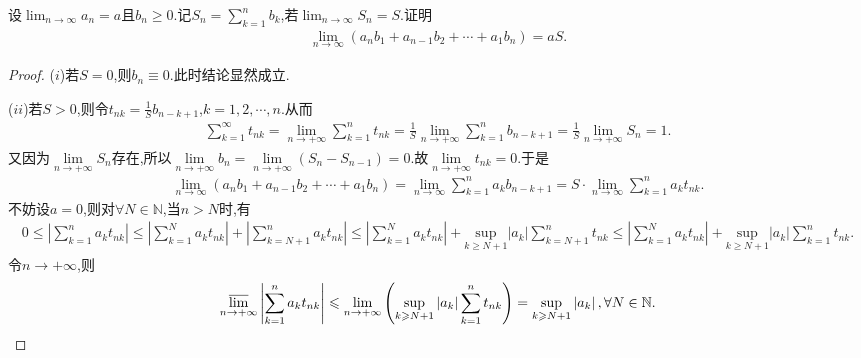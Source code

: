 \documentclass[../../main.tex]{subfiles}%
\begin{document}
\begin{proposition}\label{proposition:命题:3.422164}
设\(\lim_{n \to \infty} a_n = a\)且\(b_n \geqslant 0\).记\(S_n = \sum\limits_{k = 1}^{n} b_k\),若\(\lim_{n \to \infty} S_n = S\).证明
\begin{align*}
\lim_{n \to \infty} (a_n b_1 + a_{n - 1} b_2 + \cdots + a_1 b_n) = aS.
\end{align*}
\end{proposition}
\begin{proof}
($i$)若$S=0$,则$b_n\equiv0$.此时结论显然成立.

($ii$)若$S>0$,则令\(t_{nk} = \frac{1}{S} b_{n - k + 1}\),\(k = 1,2,\cdots,n\).从而
\begin{align*}
\sum\limits_{k=1}^{\infty}{t_{nk}}=\underset{n\rightarrow +\infty}{\lim}\sum\limits_{k=1}^n{t_{nk}}=\frac{1}{S}\underset{n\rightarrow +\infty}{\lim}\sum\limits_{k=1}^n{b_{n-k+1}}=\frac{1}{S}\underset{n\rightarrow +\infty}{\lim}S_n=1.
\end{align*}
又因为$\underset{n\rightarrow +\infty}{\lim}S_n$存在,所以$\underset{n\rightarrow +\infty}{\lim}b_n=\underset{n\rightarrow +\infty}{\lim}\left( S_n-S_{n-1} \right) =0
$.故$\underset{n\rightarrow +\infty}{\lim}t_{nk}=0$.于是
\begin{align*}
\lim_{n\rightarrow \infty} \left( a_nb_1+a_{n-1}b_2+\cdots +a_1b_n \right) =\lim_{n\rightarrow \infty} \sum\limits_{k=1}^n{a_kb_{n-k+1}}=S\cdot \lim_{n\rightarrow \infty} \sum\limits_{k=1}^n{a_kt_{nk}}.
\end{align*}
不妨设$a=0$,则对$\forall N\in\mathbb{N}$,当$n>N$时,有
\begin{align*}
0\leqslant \left| \sum\limits_{k=1}^n{a_kt_{nk}} \right|\leqslant \left| \sum\limits_{k=1}^N{a_kt_{nk}} \right|+\left| \sum\limits_{k=N+1}^n{a_kt_{nk}} \right|\leqslant \left| \sum\limits_{k=1}^N{a_kt_{nk}} \right|+\underset{k\geqslant N+1}{\mathrm{sup}}\left| a_k \right|\sum\limits_{k=N+1}^n{t_{nk}}\leqslant \left| \sum\limits_{k=1}^N{a_kt_{nk}} \right|+\underset{k\geqslant N+1}{\mathrm{sup}}\left| a_k \right|\sum\limits_{k=1}^n{t_{nk}}.
\end{align*}
令$n\to+\infty$,则
\begin{align*}
\underset{n\rightarrow +\infty}{{\varlimsup }}\left| \sum\limits_{k=1}^n{a_kt_{nk}} \right|\leqslant \underset{n\rightarrow +\infty}{\lim}\left( \underset{k\geqslant N+1}{\mathrm{sup}}\left| a_k \right|\sum\limits_{k=1}^n{t_{nk}} \right) =\underset{k\geqslant N+1}{\mathrm{sup}}\left| a_k \right|,\forall N\in \mathbb{N} .
\end{align*}

\end{proof}
\end{document}

